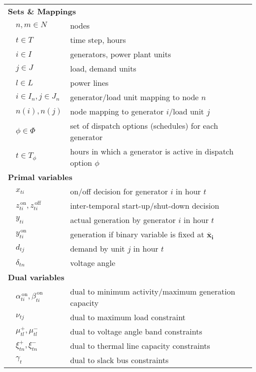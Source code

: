 \documentclass[9pt,a4paper]{article}
\newcommand{\fixedx}{\mathbf{\overline{x}_i}}
\newcommand{\on}{^{\,\text{on}}}
\newcommand{\off}{^{\,\text{off}}}
\begin{document}
\vfill
\newpage
\setcounter{table}{1}
\begin{table}
	\begin{center}
		\begin{small}
			\begin{tabular}{p{0.1 cm}p{1.9 cm}@{ ... }p{8.5 cm}}
				\hline
				\hline
				\multicolumn{3}{l}{\textbf{Sets \& Mappings}} \\
				&$n,m \in N$	& nodes \\
				&$t \in T$		& time step, hours \\
				&$i \in I$		& generators, power plant units \\
				&$j \in J$		& load, demand units \\
				&$l \in L$		& power lines \\
				&$i \in I_n, j \in J_n$ & generator/load unit mapping to node $n$ \\
				&$n(i), n(j)$ & node mapping to generator $i$/load unit $j$ \\
				&$\phi \in \Phi$	& set of dispatch options (schedules) for each generator \\
				&$t \in T_\phi$	& hours in which a generator is active in dispatch option $\phi$ \\
				\hline
				\multicolumn{3}{l}{\textbf{Primal variables}} \\
				&$x_{ti}$		& on/off decision for generator $i$ in hour $t$ \\
				&$z\on_{ti},z\off_{ti}$ & inter-temporal start-up/shut-down decision \\
				&$y_{ti}$		& actual generation by generator $i$ in hour $t$ \\
				&$y\on_{ti}$		& generation if binary variable is fixed at $\fixedx$ \\
				&$d_{tj}$		& demand by unit $j$ in hour $t$ \\
				&$\delta_{tn}$	& voltage angle \\
				\hline
				\multicolumn{3}{l}{\textbf{Dual variables}} \\
				&$\alpha\on_{ti},\beta\on_{ti}$	& dual to minimum activity/maximum generation capacity \\
				&$\nu_{tj}$			& dual to maximum load constraint \\
				&$\mu^+_{tl},\mu^-_{tl}$ & dual to voltage angle band constraints \\
				&$\xi^+_{tn},\xi^-_{tn}$ & dual to thermal line capacity constraints \\
				&$\gamma_t$	& dual to slack bus constraints \\

\end{tabular}
\end{small}
\end{center}
\end{table}
\end{document}
